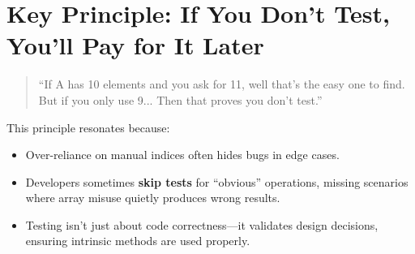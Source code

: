 \documentclass[12pt]{article}
\begin{document}
\section*{Key Principle: If You Don’t Test, You’ll Pay for It Later}

\begin{quote}

``If A has 10 elements and you ask for 11, well that's the easy one to find. But if you only use 9... Then that proves you don't test.''

\end{quote}



This principle resonates because:

\begin{itemize}

    \item Over-reliance on manual indices often hides bugs in edge cases.

    \item Developers sometimes \textbf{skip tests} for ``obvious'' operations, missing scenarios where array misuse quietly produces wrong results.

    \item Testing isn’t just about code correctness---it validates design decisions, ensuring intrinsic methods are used properly.

\end{itemize}
\end{document}
